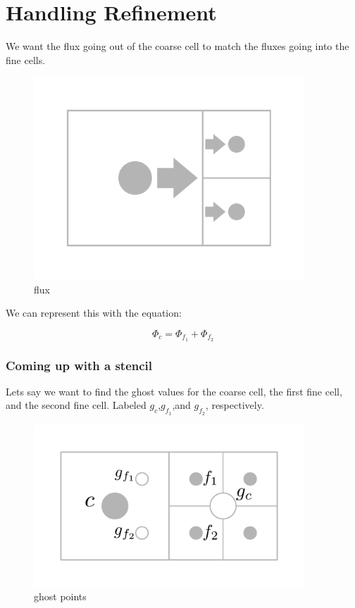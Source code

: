 \documentclass[12pt]{article}
\begin{document}
\section{Handling Refinement}
We want the flux going out of the coarse cell to match the fluxes going into 
the fine cells.

\begin{figure}[H]
    \centering
    \includegraphics[width=4in]{images/amrflux.pdf}
    \caption{flux}
\end{figure}

We can represent this with the equation:

\begin{equation}
    \Phi_{c}=\Phi_{f_1}+\Phi_{f_2}
    \label{fluxconsv}
\end{equation}

\subsubsection*{Coming up with a stencil}
Lets say we want to find the ghost values for the coarse cell, the first fine cell, and the second
fine cell. Labeled $g_c$,$g_{f_1}$,and $g_{f_2}$, respectively.

\begin{figure}[H]
    \centering
    \includegraphics[width=4in]{images/ghost.pdf}
    \caption{ghost points}
\end{figure}
\end{document}
